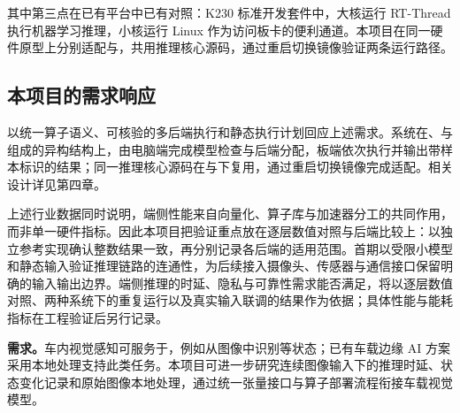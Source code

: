 其中第三点在已有平台中已有对照：K230 标准开发套件中，大核运行 RT-Thread 执行机器学习推理，小核运行 Linux 作为访问板卡的便利通道。\cite{k230report}本项目在同一硬件原型上分别适配\RealTimeSystem{}与\LinuxDistribution{}，共用推理核心源码，通过重启切换镜像验证两条运行路径。\cite{technicalreport}

\subsection{本项目的需求响应}
\ProjectName{}以统一算子语义、可核验的多后端执行和静态执行计划回应上述需求。系统在\ProcessorCore{}、\VectorUnit{}与\AcceleratorName{}组成的异构结构上，由电脑端完成模型检查与后端分配，板端依次执行并输出带样本标识的结果；同一推理核心源码在\RealTimeSystem{}与\LinuxDistribution{}下复用，通过重启切换镜像完成适配。相关设计详见第四章。

上述行业数据同时说明，端侧性能来自向量化、算子库与加速器分工的共同作用，而非单一硬件指标。因此本项目把验证重点放在逐层数值对照与后端比较上：以独立参考实现确认整数结果一致，再分别记录各后端的适用范围。首期以受限小模型和静态输入验证推理链路的连通性，为后续接入摄像头、传感器与通信接口保留明确的输入输出边界。端侧推理的时延、隐私与可靠性需求能否满足，将以逐层数值对照、两种系统下的重复运行以及真实输入联调的结果作为依据；具体性能与能耗指标在工程验证后另行记录。\cite{challenge,technicalreport,rvvcnn,cmsisnn}

\par\textbf{\DrivingExtensionDirection{}需求。}车内视觉感知可服务于\DrivingPilotTask{}，例如从图像中识别\DrivingPilotStates{}等状态；已有车载边缘 AI 方案采用本地处理支持此类任务。\cite{cabinai}本项目可进一步研究连续图像输入下的推理时延、状态变化记录和原始图像本地处理，通过统一张量接口与算子部署流程衔接车载视觉模型。
